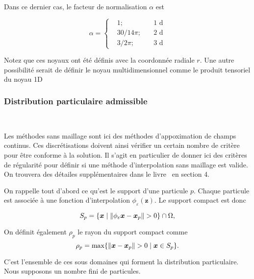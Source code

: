 Dans ce dernier cas, le facteur de normalisation $\alpha$ est

\begin{equation*}
    \alpha = \left\{ \begin{aligned}
         & 1;    \quad      & 1\text{ d} \\
         & 30/14 \pi; \quad & 2\text{ d} \\
         & 3/ 2\pi; \quad   & 3\text{ d}
    \end{aligned}
    \right.
\end{equation*}

Notez que ces noyaux ont été définis avec la coordonnée radiale $r$. Une autre possibilité serait de définir le noyau multidimensionnel comme le produit tensoriel du noyau 1D

\subsubsection{Distribution particulaire admissible}~\label{sec:part_admissible}

Les méthodes sans maillage sont ici des méthodes d'appoximation de champs continus. Ces discrétisations doivent ainsi vérifier un certain nombre de critère pour être conforme à la solution. Il s'agit en particulier de donner ici des critères de régularité pour définir si une méthode d'interpolation sans maillage est valide. On trouvera des détailes supplémentaires dans le livre~\cite{s_li_meshfree_2004} en section 4.

On rappelle tout d'abord ce qu'est le support d'une particule $p$. Chaque particule est associée à une fonction d'interpolation $\phi_\varepsilon(\bm{z})$. Le support compact est donc

\begin{equation*}
    S_p = \{\bm{x} \mid \| \phi_\varepsilon \bm{x} - \bm{x}_p \| > 0\} \cap \Omega,
\end{equation*}

On définit également $\rho_p$ le rayon du support compact comme
\begin{equation*}
    \rho_p =  \max \{\| \bm{x} - \bm{x}_p \| > 0 \mid \bm{x} \in S_p\}.
\end{equation*}

C'est l'ensemble de ces sous domaines qui forment la distribution particulaire. Nous supposons un nombre fini de particules. %

